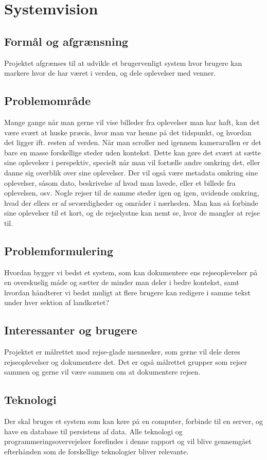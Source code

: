 \chapter{Systemvision}\label{ch:systemvision}

\section{Formål og afgrænsning}\label{sec:purpose}
Projektet afgrænses til at udvikle et brugervenligt system hvor brugere kan markere hvor de har været i verden, og dele oplevelser med venner.

\section{Problemområde}\label{sec:problemarea}
Mange gange når man gerne vil vise billeder fra oplevelser man har haft, kan det være svært at huske præcis, hvor man var henne på det tidspunkt, og hvordan det ligger ift. resten af verden. Når man scroller ned igennem kamerarullen er det bare en masse forskellige steder uden kontekst. Dette kan gøre det svært at sætte sine oplevelser i perspektiv, specielt når man vil fortælle andre omkring det, eller danne sig overblik over sine oplevelser. Der vil også være metadata omkring sine oplevelser, såsom dato, beskrivelse af hvad man lavede, eller et billede fra oplevelsen, osv. Nogle rejser til de samme steder igen og igen, uvidende omkring, hvad der ellers er af seværdigheder og områder i nærheden. Man kan så forbinde sine oplevelser til et kort, og de rejselystne kan nemt se, hvor de mangler at rejse til.

\section{Problemformulering}\label{sec:problemstatement}
Hvordan bygger vi bedst et system, som kan dokumentere ens rejseoplevelser på en overskuelig måde og sætter de minder man deler i bedre kontekst, samt hvordan håndterer vi bedst muligt at flere brugere kan redigere i samme tekst under hver sektion af landkortet?

\section{Interessanter og brugere}\label{sec:users}
Projektet er målrettet mod rejse-glade mennesker, som gerne vil dele deres rejseoplevelser og dokumentere det. Det er også målrettet grupper som rejser sammen og gerne vil være sammen om at dokumentere rejsen.

\section{Teknologi}\label{sec:technology}
Der skal bruges et system som kan køre på en computer, forbinde til en server, og have en database til persistens af data.
Alle teknologi og programmeringsovervejelser forefindes i denne rapport og vil blive gennemgået efterhånden som de forskellige teknologier bliver relevante.